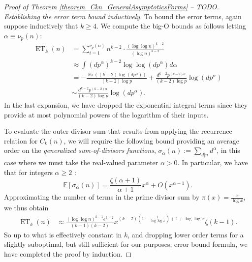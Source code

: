 \documentclass[11pt,reqno,a4letter]{article}
\numberwithin{figure}{section}
\numberwithin{table}{section}
\theoremstyle{plain}
\numberwithin{theorem}{section}
\theoremstyle{definition}
\begin{document}
\begin{proof}[Proof of Theorem \ref{theorem_Ckn_GeneralAsymptoticsForms} -- TODO]
\textit{Establishing the error term bound inductively.} 
To bound the error terms, again suppose inductively that $k \geq 4$. We compute the 
big-O bounds as follows letting $\alpha \equiv \nu_p(n)$: 
\begin{align*} 
\operatorname{ET}_k(n) & = 
     \sum_{i=1}^{\nu_p(n)} n^{k-2} \cdot \frac{(\log\log n)^{k-2}}{(\log n)^{k-2}} \\ 
     & \approx 
     \int (dp^{\alpha})^{k-2} \log\log(dp^{\alpha}) d\alpha \\ 
     & = -\frac{\operatorname{Ei}((k-2) \log(dp^{\alpha}))}{(k-2) \log p} + 
     \frac{d^{k-2} p^{(k-2)\alpha}}{(k-2) \log p} \log(dp^{\alpha}) \\ 
     & \sim \frac{d^{k-2} p^{(k-2)\alpha}}{(k-2) \log p} \log(dp^{\alpha}). 
\end{align*} 
In the last expansion, we have dropped the exponential integral terms since they provide at most 
polynomial powers of the logarithm of their inputs. 

To evaluate the outer divisor sum that results from applying the 
recurrence relation for $C_k(n)$, we will require the 
following bound providing an average order on the \emph{generalized sum-of-divisors functions}, 
$\sigma_{\alpha}(n) := \sum_{d|n} d^{\alpha}$, in this case where we must take the 
real-valued parameter $\alpha > 0$. In particular, we have that for integers $\alpha \geq 2$ 
\cite[\S 27.11]{NISTHB}: 
\[
\mathbb{E}[\sigma_{\alpha}(n)] = \frac{\zeta(\alpha+1)}{\alpha+1} x^{\alpha} + O(x^{\alpha-1}). 
\]
Approximating the number of terms in the prime divisor sum by $\pi(x) = \frac{x}{\log x}$, 
we thus obtain 
\begin{align*} 
\operatorname{ET}_k(n) & \approx \frac{(\log\log n)^{k-1} e^{k-2}}{(k-1)(k-2)} 
     x^{(k-2)\left(1-\frac{1}{\log\log x}\right)+1+\log\log x} \zeta(k-1). 
\end{align*} 
So up to what is effectively constant in $k$, and dropping lower order terms for a slightly 
suboptimal, but still sufficient for our purposes, error bound formula, 
we have completed the proof by induction. 
\end{proof} 
\end{document}
